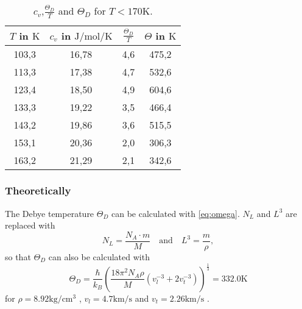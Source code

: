 \begin{table}
    \centering
    \begin{tabular}{c c c c}
        \toprule
        $T$ in $\si{\kelvin}$ & $c_v$ in $\si{\joule\per\mole\per\kelvin}$ & $\frac{\Theta_D}{T}$ & $\Theta$ in $\si{\kelvin}$ \\
        \midrule
        103,3  &  16,78  &  4,6  &  475,2  \\
        113,3  &  17,38  &  4,7  &  532,6  \\
        123,4  &  18,50  &  4,9  &  604,6  \\
        133,3  &  19,22  &  3,5  &  466,4  \\
        143,2  &  19,86  &  3,6  &  515,5  \\
        153,1  &  20,36  &  2,0  &  306,3  \\
        163,2  &  21,29  &  2,1  &  342,6  \\
        \bottomrule
    \end{tabular}
    \caption{$c_v$,$\frac{\Theta_D}{T}$ and $\Theta_D$ for $T < 170 \si{\kelvin}$. }
    \label{tab:deb2}
\end{table}

\subsubsection{Theoretically}
The Debye temperature $\Theta_D$ can be calculated with \eqref{eq:omega}.
$N_L$ and $L^3$ are replaced with
\begin{equation*}
    N_L = \frac{N_A \cdot m }{M} \quad \text{and} \quad L^3= \frac{m}{\rho},
\end{equation*}
so that $\Theta_D$ can also be calculated with
\begin{equation}
    \Theta_D = \frac{\hbar}{k_B} \left( \frac{18 \pi^2 N_A \rho}{M}\left( v^{-3}_l + 2 v^{-3}_t\right)\right)^{\frac{1}{3}} = 332.0 \si{\kelvin}
\end{equation}
\noindent for $\rho = 8.92 \si{\kg\per\cubic\cm}$ \cite{V0_kupfer},
 $v_l=4.7 \si{\km\per\s}$ and $v_t=2.26 \si{\km\per\s}$ \cite{V47}.

